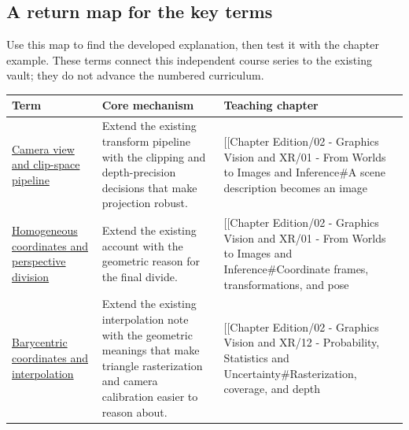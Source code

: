 \subsection{A return map for the key terms}\label{04-visual-computing-ii-ch035-a-return-map-for-the-key-terms}

\hypertarget{04-visual-computing-ii-ch035-a-return-map-for-the-key-terms}{}

Use this map to find the developed explanation, then test it with the chapter example. These terms connect this independent course series to the existing vault; they do not advance the numbered curriculum.

{\def\LTcaptype{none} %
\begin{longtable}[]{@{}
  >{\raggedright\arraybackslash}p{}
  >{\raggedright\arraybackslash}p{}
  >{\raggedright\arraybackslash}p{}@{}}
\toprule\noalign{}
\begin{minipage}[b]{\linewidth}\raggedright
Term
\end{minipage} & \begin{minipage}[b]{\linewidth}\raggedright
Core mechanism
\end{minipage} & \begin{minipage}[b]{\linewidth}\raggedright
Teaching chapter
\end{minipage} \\
\midrule\noalign{}
\endhead
\bottomrule\noalign{}
\endlastfoot
\hyperref[appendix-1c07d64f5e70]{Camera view and clip-space pipeline} & Extend the existing transform pipeline with the clipping and depth-precision decisions that make projection robust. & {[}{[}Chapter Edition/02 - Graphics Vision and XR/01 - From Worlds to Images and Inference\#A scene description becomes an image \\
\hyperref[appendix-cb3b26862282]{Homogeneous coordinates and perspective division} & Extend the existing account with the geometric reason for the final divide. & {[}{[}Chapter Edition/02 - Graphics Vision and XR/01 - From Worlds to Images and Inference\#Coordinate frames, transformations, and pose \\
\hyperref[appendix-02b9d9a81dca]{Barycentric coordinates and interpolation} & Extend the existing interpolation note with the geometric meanings that make triangle rasterization and camera calibration easier to reason about. & {[}{[}Chapter Edition/02 - Graphics Vision and XR/12 - Probability, Statistics and Uncertainty\#Rasterization, coverage, and depth \\

\end{longtable}}
